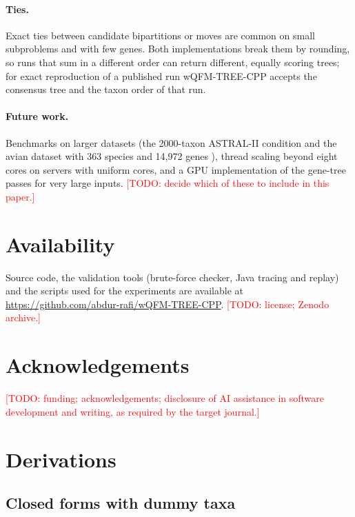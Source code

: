 \documentclass[11pt,a4paper]{article}
\newcommand{\todo}[1]{\textcolor{red}{[TODO: #1]}}
\newcommand{\cpp}{wQFM-TREE-CPP}
\begin{document}
\paragraph{Ties.} Exact ties between candidate bipartitions or moves are common on small subproblems
and with few genes. Both implementations break them by rounding, so runs that sum in a different
order can return different, equally scoring trees; for exact reproduction of a published run \cpp{}
accepts the consensus tree and the taxon order of that run.

\paragraph{Future work.} Benchmarks on larger datasets (the 2000-taxon ASTRAL-II condition and the
avian dataset with 363 species and 14{,}972 genes \citep{stiller2024}), thread scaling beyond eight
cores on servers with uniform cores, and a GPU implementation of the gene-tree passes for very large inputs. \todo{decide
which of these to include in this paper.}

\section*{Availability}
Source code, the validation tools (brute-force checker, Java tracing and replay) and the scripts used
for the experiments are available at \url{https://github.com/abdur-rafi/wQFM-TREE-CPP}.
\todo{license; Zenodo archive.}

\section*{Acknowledgements}
\todo{funding; acknowledgements; disclosure of AI assistance in software development and writing, as
required by the target journal.}




\appendix
\section{Derivations}\label{app:derivations}

\subsection{Closed forms with dummy taxa}\label{app:poly}
\end{document}
